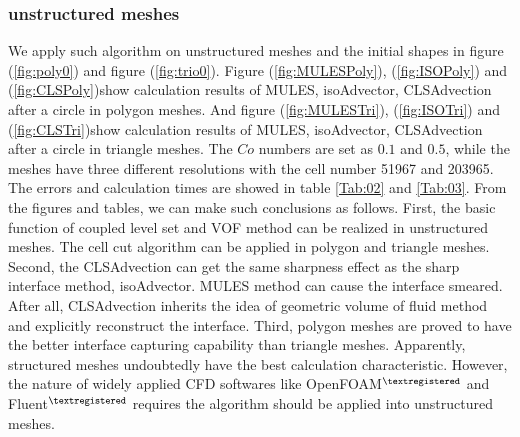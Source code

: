 \subsubsection{unstructured meshes}
We apply such algorithm on unstructured meshes and the initial shapes in figure (\ref{fig:poly0}) and figure (\ref{fig:trio0}). Figure (\ref{fig:MULESPoly}), (\ref{fig:ISOPoly}) and (\ref{fig:CLSPoly})show calculation results of MULES, isoAdvector, CLSAdvection after a circle in polygon meshes. And figure (\ref{fig:MULESTri}), (\ref{fig:ISOTri}) and (\ref{fig:CLSTri})show calculation results of MULES, isoAdvector, CLSAdvection after a circle in triangle meshes. The $Co$ numbers are set as $0.1$ and $0.5$, while the meshes have three different resolutions with the cell number 51967 and 203965. The errors and calculation times are showed in table \ref{Tab:02} and \ref{Tab:03}. From the figures and tables, we can make such conclusions as follows. First, the basic function of coupled level set and VOF method can be realized in unstructured meshes. The cell cut algorithm can be applied in polygon and triangle meshes. Second, the CLSAdvection can get the same sharpness effect as the sharp interface method, isoAdvector. MULES method can cause the interface smeared. After all, CLSAdvection inherits the idea of geometric volume of fluid method and explicitly reconstruct the interface. Third, polygon meshes are proved to have the better interface capturing capability than triangle meshes. Apparently, structured meshes undoubtedly have the best calculation characteristic. However, the nature of widely applied CFD softwares like OpenFOAM$^{\textregistered}$ and Fluent$^{\textregistered}$ requires the algorithm should be applied into unstructured meshes.
